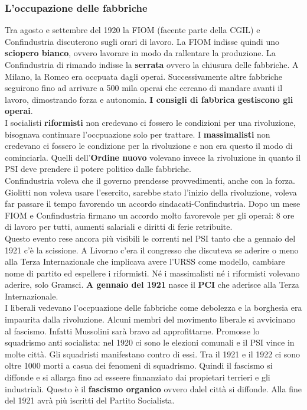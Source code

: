 \subsubsection{L'occupazione delle fabbriche}
Tra agosto e settembre del 1920 la FIOM (facente parte della CGIL) e Confindustria discuterono sugli
orari di lavoro. La FIOM indisse quindi uno \textbf{sciopero bianco}, ovvero lavorare in modo da
rallentare la produzione. La Confindustria di rimando indisse la \textbf{serrata} ovvero la chiusura
delle fabbriche. A Milano, la Romeo era occpuata dagli operai. Successivamente altre fabbriche 
seguirono fino ad arrivare a 500 mila operai che cercano di mandare avanti il lavoro, dimostrando
forza e autonomia. \textbf{I consigli di fabbrica gestiscono gli operai}.\\
I socialisti \textbf{riformisti} non credevano ci fossero le condizioni per una rivoluzione, 
bisognava continuare l'occpuazione solo per trattare. I \textbf{massimalisti} non credevano ci
fossero le condizione per la rivoluzione e non era questo il modo di cominciarla. Quelli 
dell'\textbf{Ordine nuovo} volevano invece la rivoluzione in quanto il PSI deve prendere il potere
politico dalle fabbriche.\\
Confindustria voleva che il governo prendesse provvedimenti, anche con la forza.\\
Giolitti non voleva usare l'esercito, sarebbe stato l'inizio della rivoluzione, voleva far passare il
tempo favorendo un accordo sindacati-Confindustria. Dopo un mese FIOM e Confindustria firmano un 
accordo molto favorevole per gli operai: 8 ore di lavoro per tutti, aumenti salariali e diritti di 
ferie retribuite.\\
Questo evento rese ancora più visibili le correnti nel PSI tanto che a gennaio del 1921 c'è la 
scissione. A Livorno c'era il congresso che discuteva se aderire o meno alla Terza Internazionale
che implicava avere l'URSS come modello, cambiare nome di partito ed espellere i riformisti. Né
i massimalisti né i riformisti volevano aderire, solo Gramsci. \textbf{A gennaio del 1921} nasce
il \textbf{PCI} che aderisce alla Terza Internazionale.\\
I liberali vedevano l'occpuazione delle fabbriche come debolezza e la borghesia era impaurita dalla
rivoluzione. Alcuni membri del movimento liberale si avvicinano al fascismo. Infatti Mussolini sarà
bravo ad approfittarne. Promosse lo squadrismo anti socialista: nel 1920 ci sono le elezioni comunali
e il PSI vince in molte città. Gli squadristi manifestano contro di essi. Tra il 1921 e il 1922 ci 
sono oltre 1000 morti a casua dei fenomeni di squadrismo. Quindi il fascismo si diffonde e si
allarga fino ad esseere finnanziato dai propietari terrieri e gli industriali. Questo è il
\textbf{fascismo organico} ovvero dalel città si diffonde. Alla fine del 1921 avrà più iscritti del
Partito Socialista.


